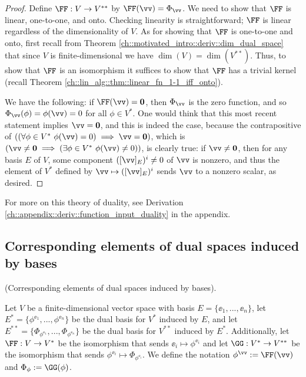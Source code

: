 \begin{proof}
    Define $\FF:V \rightarrow V^{**}$ by $\FF(\vv) = \Phi_\vv$. We need to show that $\FF$ is linear, one-to-one, and onto. Checking linearity is straightforward; $\FF$ is linear regardless of the dimensionality of $V$. As for showing that $\FF$ is one-to-one and onto, first recall from Theorem \ref{ch::motivated_intro::deriv::dim_dual_space} that since $V$ is finite-dimensional we have $\dim(V) = \dim(V^{**})$. Thus, to show that $\FF$ is an isomorphism it suffices to show that $\FF$ has a trivial kernel (recall Theorem \ref{ch::lin_alg::thm::linear_fn_1-1_iff_onto}).
    
    We have the following: if $\FF(\vv) = \mathbf{0}$, then $\Phi_\vv$ is the zero function, and so $\Phi_\vv(\phi) = \phi(\vv) = 0$ for all $\phi \in V^*$. One would think that this most recent statement implies $\vv = \mathbf{0}$, and this is indeed the case, because the contrapositive of $((\forall \phi \in V^* \spc \phi(\vv) = 0) \implies \vv = \mathbf{0})$, which is $(\vv \neq \mathbf{0} \implies (\exists \phi \in V^* \spc \phi(\vv) \neq 0))$, is clearly true: if $\vv \neq \mathbf{0}$, then for any basis $E$ of $V$, some component $([\vv]_E)^i \neq 0$ of $\vv$ is nonzero, and thus the element of $V^*$ defined by $\vv \mapsto ([\vv]_E)^i$ sends $\vv$ to a nonzero scalar, as desired.
\end{proof}

For more on this theory of duality, see Derivation \ref{ch::appendix::deriv::function_input_duality} in the appendix.

\newpage

\subsection*{Corresponding elements of dual spaces induced by bases}

\begin{defn}
    (Corresponding elements of dual spaces induced by bases).
    
    Let $V$ be a finite-dimensional vector space with basis $E = \{\ee_1, ..., \ee_n\}$, let $E^* = \{\phi^{\ee_1}, ..., \phi^{\ee_n}\}$ be the dual basis for $V^*$ induced by $E$, and let $E^{**} = \{\Phi_{\phi^{\ee_1}}, ..., \Phi_{\phi^{\ee_n}}\}$ be the dual basis for $V^{**}$ induced by $E^*$. Additionally, let $\FF:V \rightarrow V^*$ be the isomorphism that sends $\ee_i \mapsto \phi^{\ee_i}$ and let $\GG:V^* \rightarrow V^{**}$ be the isomorphism that sends $\phi^{\ee_i} \mapsto \Phi_{\phi^{\ee_i}}$. We define the notation $\phi^\vv := \FF(\vv)$ and $\Phi_\phi := \GG(\phi)$.
\end{defn}

